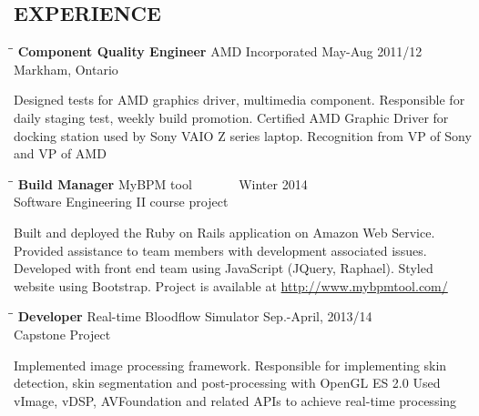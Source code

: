 \documentclass{res}
\begin{document}
\begin{resume}
\section{EXPERIENCE}
   \vspace{-0.1in}	
   \begin{tabbing}
   \hspace{2.3in}\= \hspace{2.6in}\= \kill %
    {\bf Component Quality Engineer} \>AMD Incorporated     \>May-Aug 2011/12\\
                             \>Markham, Ontario
   \end{tabbing}\vspace{-20pt}      %
    Designed tests for AMD graphics driver, multimedia component.
    Responsible for daily staging test, weekly build promotion.       
    Certified AMD Graphic Driver for docking station used by Sony VAIO Z series laptop.
    Recognition from VP of Sony and VP of AMD
   \begin{tabbing}
   \hspace{2.3in}\= \hspace{2.6in}\= \kill %
    {\bf Build Manager} \>MyBPM tool   \> ~~~~~~ Winter 2014\\
                          \>Software Engineering II course project
   \end{tabbing}\vspace{-20pt}
    Built and deployed the Ruby on Rails application on Amazon Web Service.
    Provided assistance to team members with development associated issues.
    Developed with front end team using JavaScript (JQuery, Raphael).
    Styled website using Bootstrap. Project is available at \linebreak
    \url{http://www.mybpmtool.com/}
   \begin{tabbing}%
   \hspace{2.3in}\= \hspace{2.6in}\= \kill %
   {\bf Developer}  \>Real-time Bloodflow Simulator \> Sep.-April, 2013/14\\
                          \>Capstone Project
   \end{tabbing}\vspace{-20pt}
    Implemented image processing framework.          
    Responsible for implementing skin detection, skin segmentation and post-processing with OpenGL ES 2.0
    Used vImage, vDSP, AVFoundation and related APIs to achieve real-time processing         



\end{resume}
\end{document}
